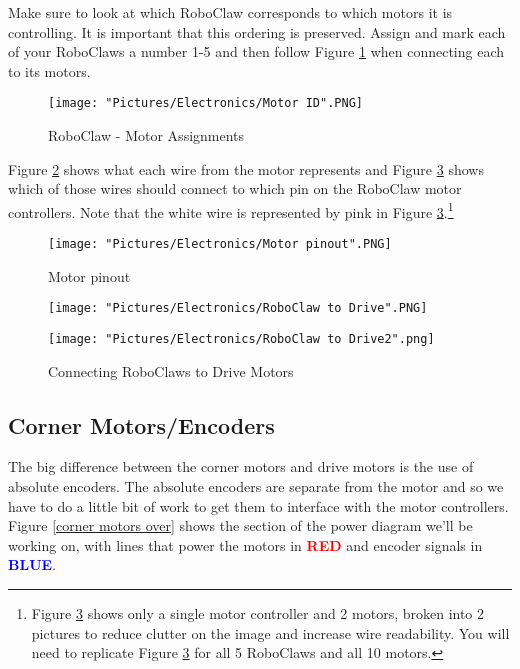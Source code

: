 \documentclass[12pt]{article}
\begin{document}
\noindent Make sure to look at which RoboClaw corresponds to which motors it is controlling. It is important that this ordering is preserved. Assign and mark each of your RoboClaws a number 1-5 and then follow Figure \ref{motorID} when connecting each to its motors. 

\begin{figure}[H]
 	\centering
	\texttt{[image: "Pictures/Electronics/Motor ID".PNG]}
 	\caption{RoboClaw - Motor Assignments}
	\label{motorID}
\end{figure}

Figure \ref{Motor pinout} shows what each wire from the motor represents and Figure \ref{RC to Drive} shows which of those wires should connect to which pin on the RoboClaw motor controllers. Note that the white wire is represented by pink in Figure \ref{RC to Drive}.\footnote{Figure \ref{RC to Drive} shows only a single motor controller and 2 motors, broken into 2 pictures to reduce clutter on the image and increase wire readability. You will need to replicate Figure \ref{RC to Drive} for all 5 RoboClaws and all 10 motors.} 

\begin{figure}[H]
 	\centering
	\texttt{[image: "Pictures/Electronics/Motor pinout".PNG]}
 	\caption{Motor pinout}
	\label{Motor pinout}
\end{figure}


\begin{figure}[H]
 	\centering
  	\begin{minipage}[b]{0.475\textwidth}
		\texttt{[image: "Pictures/Electronics/RoboClaw to Drive".PNG]}
  	\end{minipage}
  	\hfill
  	\begin{minipage}[b]{0.425\textwidth}
    		\texttt{[image: "Pictures/Electronics/RoboClaw to Drive2".png]}
  	\end{minipage}
	\caption{Connecting RoboClaws to Drive Motors}
	\label{RC to Drive}
\end{figure}

\subsection{Corner Motors/Encoders}
The big difference between the corner motors and drive motors is the use of absolute encoders. The absolute encoders are separate from the motor and so we have to do a little bit of work to get them to interface with the motor controllers. Figure \ref{corner motors over} shows the section of the power diagram we'll be working on, with lines that power the motors in \textcolor{red}{\textbf{RED}} and encoder signals in \textcolor{blue}{\textbf{BLUE}}.
\end{document}
